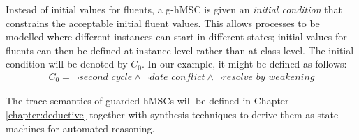 \begin{description}
Instead of initial values for fluents, a g-hMSC is given an \emph{initial condition} that constrains the acceptable initial fluent values. This allows processes to be modelled where different instances can start in different states; initial values for fluents can then be defined at instance level rather than at class level. The initial condition will be denoted by $C_0$. In our example, it might be defined as follows:
\begin{align*}
C_0 = \neg second\_cycle \wedge \neg date\_conflict \wedge \neg resolve\_by\_weakening
\end{align*}

\end{description} 

The trace semantics of guarded hMSCs will be defined in Chapter \ref{chapter:deductive} together with synthesis techniques to derive them as state machines for automated reasoning.
